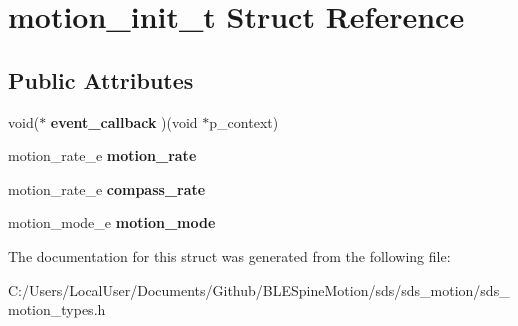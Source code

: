 \hypertarget{structmotion__init__t}{}\section{motion\+\_\+init\+\_\+t Struct Reference}
\label{structmotion__init__t}
\subsection*{Public Attributes}
\begin{DoxyCompactItemize}
\item 
\mbox{\label{structmotion__init__t_a4ad6d40f1e94e62dd27f43ddd4522c89}} 
void($\ast$ {\bfseries event\+\_\+callback} )(void $\ast$p\+\_\+context)
\item 
\mbox{\label{structmotion__init__t_ada76a1bcd1db5af79cd3dde2f91d33f0}} 
motion\+\_\+rate\+\_\+e {\bfseries motion\+\_\+rate}
\item 
\mbox{\label{structmotion__init__t_a4ba4c3893856fd7ce049aba49c0610f2}} 
motion\+\_\+rate\+\_\+e {\bfseries compass\+\_\+rate}
\item 
\mbox{\label{structmotion__init__t_a6ac234881ee42d9d1d24b5386fdd30f7}} 
motion\+\_\+mode\+\_\+e {\bfseries motion\+\_\+mode}
\end{DoxyCompactItemize}


The documentation for this struct was generated from the following file\+:\begin{DoxyCompactItemize}
\item 
C\+:/\+Users/\+Local\+User/\+Documents/\+Github/\+B\+L\+E\+Spine\+Motion/sds/sds\+\_\+motion/sds\+\_\+motion\+\_\+types.\+h\end{DoxyCompactItemize}
